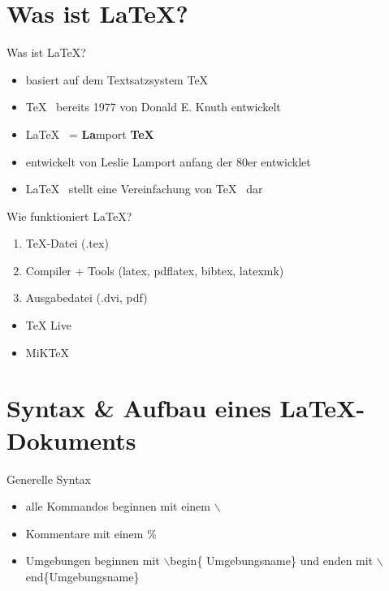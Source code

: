 
\section{Was ist \LaTeX ?}

\begin{frame}{Was ist \LaTeX ?}
	\begin{itemize}[<+->]
	\item basiert auf dem Textsatzsystem \TeX
	\item \TeX \mbox{ } bereits 1977 von Donald E. Knuth entwickelt
	\item \LaTeX \mbox{ } = \textbf{La}mport \textbf{TeX}
	\item entwickelt von Leslie Lamport anfang der 80er entwicklet
	\item \LaTeX \mbox{ } stellt eine Vereinfachung von \TeX \mbox{ } dar
	\end{itemize}
\end{frame}

\begin{frame}{Wie funktioniert \LaTeX?}
	\begin{enumerate}[<+->]
	\item \TeX -Datei (.tex)
	\item Compiler + Tools (latex, pdflatex, bibtex, latexmk)
	\item Ausgabedatei (.dvi, pdf)
	\end{enumerate}

	\begin{itemize}[<+->]
	\item TeX Live
	\item MiKTeX
	\end{itemize}
\end{frame}

\section{Syntax \& Aufbau eines \LaTeX -Dokuments}

\begin{frame}{Generelle Syntax}
	\begin{itemize}[<+->]
		\item alle Kommandos beginnen mit einem $\backslash$
		\item Kommentare mit einem \%
		\item Umgebungen beginnen mit $\backslash$begin\{ Umgebungsname\} und enden mit $\backslash$end\{Umgebungsname\}
	\end{itemize}
\end{frame}

